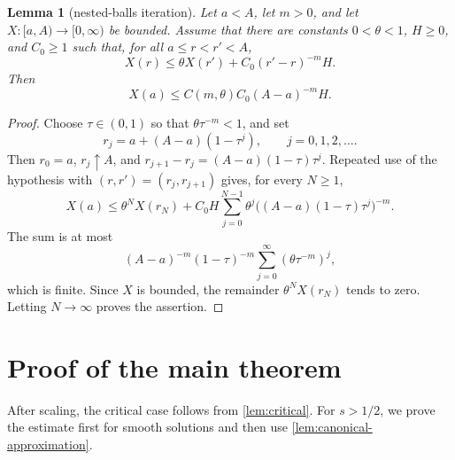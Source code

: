 \documentclass[10pt,a4paper]{amsart}
\numberwithin{equation}{section}
\newtheorem{lemma}[theorem]{Lemma}
\newcommand{\rev}[1]{#1}
\begin{document}
\begin{lemma}[nested-balls iteration]\label{lem:nested-balls}
Let $a<A$, let $m>0$, and let $X:[a,A)\to[0,\infty)$ be bounded.
Assume that there are constants $0<\theta<1$, $H\ge0$, and
$C_0\ge1$ such that, for all $a\le r<r'<A$,
\[
 X(r)\le \theta X(r')+C_0(r'-r)^{-m}H.
\]
Then
\[
 X(a)\le C(m,\theta)C_0(A-a)^{-m}H.
\]
\end{lemma}

\begin{proof}
Choose $\tau\in(0,1)$ so that $\theta\tau^{-m}<1$, and set
\[
 r_j=a+(A-a)(1-\tau^j),\qquad j=0,1,2,\ldots.
\]
Then $r_0=a$, $r_j\uparrow A$, and
$r_{j+1}-r_j=(A-a)(1-\tau)\tau^j$.  Repeated use of the hypothesis
with $(r,r')=(r_j,r_{j+1})$ gives, for every $N\ge1$,
\[
 X(a)\le \theta^NX(r_N)+C_0H\sum_{j=0}^{N-1}
 \theta^j\bigl((A-a)(1-\tau)\tau^j\bigr)^{-m}.
\]
The sum is at most
\[
 (A-a)^{-m}(1-\tau)^{-m}
 \sum_{j=0}^{\infty}(\theta\tau^{-m})^j,
\]
which is finite.  Since $X$ is bounded, the remainder
$\theta^NX(r_N)$ tends to zero.  Letting $N\to\infty$ proves the
assertion.
\end{proof}

\section{Proof of the main theorem}\label{sec:proof}

\rev{After scaling, the critical case follows from
\cref{lem:critical}.  For $s>1/2$, we prove the estimate first for smooth
solutions and then use \cref{lem:canonical-approximation}.}
\end{document}
